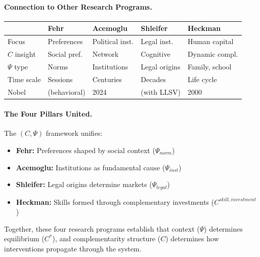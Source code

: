 \paragraph{Connection to Other Research Programs.}

\begin{center}
\renewcommand{\arraystretch}{1.2}
\begin{tabular}{lllll}
\hline
& \textbf{Fehr} & \textbf{Acemoglu} & \textbf{Shleifer} & \textbf{Heckman} \\
\hline
Focus & Preferences & Political inst. & Legal inst. & Human capital \\
$C$ insight & Social pref. & Network & Cognitive & Dynamic compl. \\
$\Psi$ type & Norms & Institutions & Legal origins & Family, school \\
Time scale & Sessions & Centuries & Decades & Life cycle \\
Nobel & (behavioral) & 2024 & (with LLSV) & 2000 \\
\hline
\end{tabular}
\end{center}

\paragraph{The Four Pillars United.}
The $(C, \Psi)$ framework unifies:
\begin{itemize}
  \item \textbf{Fehr:} Preferences shaped by social context ($\Psi_{norm}$)
  \item \textbf{Acemoglu:} Institutions as fundamental cause ($\Psi_{inst}$)
  \item \textbf{Shleifer:} Legal origins determine markets ($\Psi_{legal}$)
  \item \textbf{Heckman:} Skills formed through complementary investments ($C^{skill,investment}$)
\end{itemize}

Together, these four research programs establish that context ($\Psi$)
determines equilibrium ($C^*$), and complementarity structure ($C$)
determines how interventions propagate through the system.




